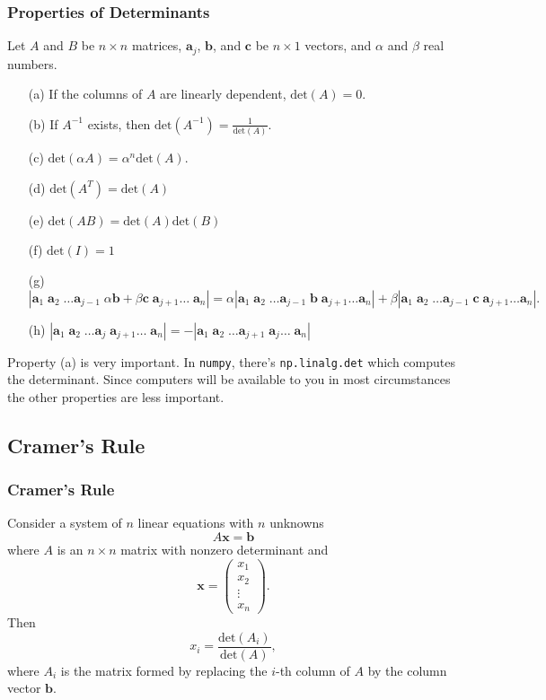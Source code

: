\documentclass{beamer}
\begin{document}
\begin{frame}
\frametitle{Properties of Determinants} 
{\tiny
Let $A$ and $B$ be $n\times n$ matrices, ${\boldsymbol a_j}$, ${\boldsymbol b}$, and ${\boldsymbol c}$ be $n\times 1$ vectors, and $\alpha$ and $\beta$ real numbers.
\begin{enumerate}
\item[(a)] If the columns of $A$ are linearly dependent, $\text{det}(A) = 0$.
\item[(b)] If $A^{-1}$ exists, then $\text{det}(A^{-1}) = \frac{1}{\text{det}(A)}$.
\item[(c)] $\text{det}(\alpha A) = \alpha^n \text{det}(A)$.
\item[(d)] $\text{det}(A^T) = \text{det}(A)$
\item[(e)] $\text{det}(AB) = \text{det}(A)\text{det}(B)$
\item[(f)]  $\text{det}(I) = 1$

\item[(g)] $
\left| {\boldsymbol a_1}\;	{\boldsymbol a_2}\; \ldots {\boldsymbol a_{j - 1}}\;	\alpha {\boldsymbol b}  + \beta {\boldsymbol c}\; {\boldsymbol a_{j + 1}}  \ldots\;  {\boldsymbol a_n}\right| = \alpha \left| {\boldsymbol a_1}\; {\boldsymbol a_2}\; \ldots {\boldsymbol a_{j - 1}}\; {\boldsymbol b}\; {\boldsymbol a_{j + 1}} \ldots  {\boldsymbol a_n}\right| + \beta \left| {\boldsymbol a_1}\; {\boldsymbol a_2}\;	 \ldots {\boldsymbol a_{j-1}}\; {\boldsymbol c} \; {\boldsymbol a_{j + 1}} \ldots {\boldsymbol a_n}\right|.
$
\item[(h)] $
\left| {\boldsymbol a_1}\;	{\boldsymbol a_2}\; \ldots {\boldsymbol a_{j }}\;	{\boldsymbol a_{j + 1}}   \ldots\;  {\boldsymbol a_n}\right|  = -\left| {\boldsymbol a_1}\;	{\boldsymbol a_2}\; \ldots {\boldsymbol a_{j + 1}}\;	{\boldsymbol a_{j}}   \ldots\;  {\boldsymbol a_n}\right| 
$
\end{enumerate}
Property (a) is very important. In \texttt{numpy}, there's \texttt{np.linalg.det} which computes the determinant. Since computers will be available to you in most circumstances the other properties are less important.}
\end{frame}

\subsection{Cramer's Rule}

\begin{frame}
\frametitle{Cramer's Rule}
\small
Consider a system of $n$ linear equations with $n$ unknowns
$$
 A {\boldsymbol x} = {\boldsymbol b}
$$
where $A$ is an $n\times n$ matrix with nonzero determinant and 
$$
{\boldsymbol x} = \left(\begin{array}{c} x_1\\ x_2\\ \vdots\\ x_n\end{array}\right).
$$
Then 
$$
x_i = \frac{\text{det}(A_i)}{\text{det}(A)},
$$
where $A_i$ is the matrix formed by replacing the $i$-th column of $A$ by the column vector ${\boldsymbol b}$.
\end{frame}
\end{document}
